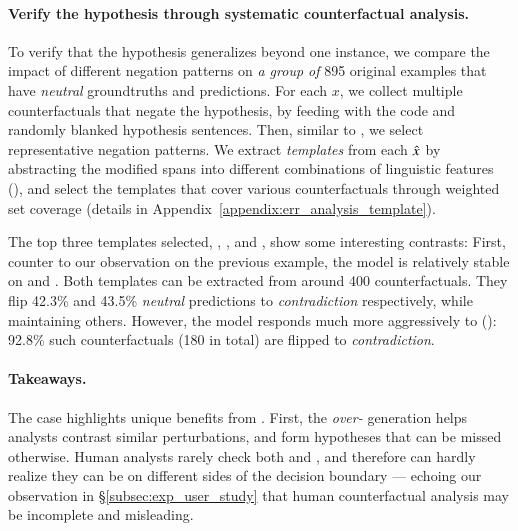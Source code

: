 
\paragraph{Verify the hypothesis through systematic counterfactual analysis.}
To verify that the hypothesis generalizes beyond one instance, we compare the impact of different negation patterns on \emph{a group of} 895 original examples that have \emph{neutral} groundtruths and predictions.
For each $x$, we collect multiple counterfactuals that negate the hypothesis, by feeding \sysname with the  code and randomly blanked hypothesis sentences.
Then, similar to \citet{wu2020tempura}, we select representative negation patterns.
We extract \emph{templates} from each $\hat{x}$ by abstracting the modified spans into different combinations of linguistic features (\eg {}), and select the templates that cover various counterfactuals through weighted set coverage (details in Appendix~\ref{appendix:err_analysis_template}).

The top three templates selected, , , and , show some interesting contrasts: 
First, counter to our observation on the previous example, the model is relatively stable on  and .
Both templates can be extracted from around 400 counterfactuals.
They flip 42.3\% and 43.5\% \emph{neutral} predictions to \emph{contradiction} respectively, while maintaining others.
However, the model responds much more aggressively to  (): 92.8\% such counterfactuals (180 in total) are flipped to \emph{contradiction}.


\paragraph{Takeaways.}
The case highlights unique benefits from \sysname.
First, the \emph{over-} generation helps analysts contrast similar perturbations, and form hypotheses that can be missed otherwise.
Human analysts rarely check both  and , and therefore can hardly realize they can be on different sides of the decision boundary --- echoing our observation in \S\ref{subsec:exp_user_study} that human counterfactual analysis may be incomplete and misleading.

